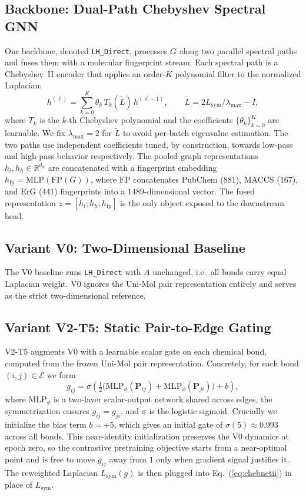 \documentclass[sigconf,nonacm,anonymous,review]{acmart}
\begin{document}
\subsection{Backbone: Dual-Path Chebyshev Spectral GNN}
Our backbone, denoted \texttt{LH\_Direct}, processes $G$ along two parallel spectral paths and fuses them with a molecular fingerprint stream. Each spectral path is a Chebyshev~II encoder \citep{he2022chebnetii} that applies an order-$K$ polynomial filter to the normalized Laplacian:
\begin{equation}
    h^{(\ell)} = \sum_{k=0}^{K} \theta_k\, T_k(\tilde L)\, h^{(\ell-1)},
    \qquad \tilde L = 2L_{\mathrm{sym}}/\lambda_{\max} - I,
    \label{eq:chebnetii}
\end{equation}
where $T_k$ is the $k$-th Chebyshev polynomial and the coefficients $\{\theta_k\}_{k=0}^{K}$ are learnable. We fix $\lambda_{\max}{=}2$ for $\tilde L$ to avoid per-batch eigenvalue estimation. The two paths use independent coefficients tuned, by construction, towards low-pass and high-pass behavior respectively. The pooled graph representations $h_l, h_h\in\mathbb{R}^{d_h}$ are concatenated with a fingerprint embedding $h_{\mathrm{fp}}=\mathrm{MLP}(\mathrm{FP}(G))$, where $\mathrm{FP}$ concatenates PubChem (881), MACCS (167), and ErG (441) fingerprints into a $1489$-dimensional vector. The fused representation $z = [h_l; h_h; h_{\mathrm{fp}}]$ is the only object exposed to the downstream head.

\subsection{Variant V0: Two-Dimensional Baseline}
The V0 baseline runs \texttt{LH\_Direct} with $A$ unchanged, i.e.\ all bonds carry equal Laplacian weight. V0 ignores the Uni-Mol pair representation entirely and serves as the strict two-dimensional reference.

\subsection{Variant V2-T5: Static Pair-to-Edge Gating}
\label{sec:v2t5}
V2-T5 augments V0 with a learnable scalar gate on each chemical bond, computed from the frozen Uni-Mol pair representation. Concretely, for each bond $(i,j)\in\mathcal{E}$ we form
\begin{equation}
    g_{ij} = \sigma\!\left( \tfrac{1}{2}\bigl(\mathrm{MLP}_\phi(\mathbf{P}_{ij}) + \mathrm{MLP}_\phi(\mathbf{P}_{ji})\bigr) + b \right),
    \label{eq:v2t5gate}
\end{equation}
where $\mathrm{MLP}_\phi$ is a two-layer scalar-output network shared across edges, the symmetrization ensures $g_{ij}=g_{ji}$, and $\sigma$ is the logistic sigmoid. Crucially we initialize the bias term $b=+5$, which gives an initial gate of $\sigma(5)\approx 0.993$ across all bonds. This near-identity initialization preserves the V0 dynamics at epoch zero, so the contrastive pretraining objective starts from a near-optimal point and is free to move $g_{ij}$ away from $1$ only when gradient signal justifies it. The reweighted Laplacian $L_{\mathrm{sym}}(g)$ is then plugged into Eq.~(\ref{eq:chebnetii}) in place of $L_{\mathrm{sym}}$.
\end{document}
